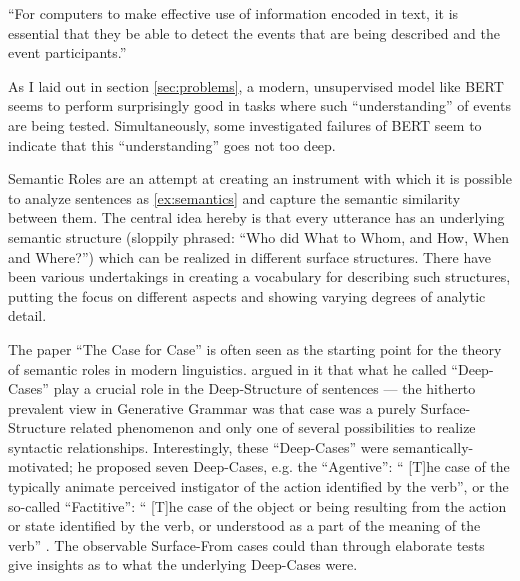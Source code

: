 ``For computers to make effective use of information encoded in text, it is essential that
they be able to detect the events that are being described and the event participants.''
\citep{palmer2010semantic}

As I laid out in section \ref{sec:problems}, a modern, unsupervised model
like BERT seems to perform surprisingly good in tasks where such ``understanding'' of
events are being tested.
Simultaneously, some investigated failures of BERT seem to indicate that this ``understanding''
goes not too deep.

Semantic Roles are an attempt at creating an instrument with which it is possible to analyze
sentences as \ref{ex:semantics} and capture the semantic similarity between them. The central
idea hereby is that every utterance has an underlying semantic structure (sloppily phrased: ``Who did What to Whom, and How, When and Where?'') which
can be realized in different surface structures. There have been various undertakings in
creating a vocabulary for describing such structures, putting the focus on different aspects and showing varying degrees of {\color{red} analytic detail}.

The paper ``The Case for Case'' \citep{fillmore1967case} is often seen as the starting point for
the theory of semantic roles in modern linguistics. \citeauthor{fillmore1967case} argued in it
that what he called ``Deep-Cases'' play a crucial role in the Deep-Structure of sentences ---
the hitherto prevalent view in Generative Grammar was that case was a purely Surface-Structure
related phenomenon and only one of several possibilities to realize syntactic relationships.
Interestingly, these ``Deep-Cases'' were semantically-motivated; he proposed
seven Deep-Cases, e.g. the ``Agentive'': `` [T]he case of the typically animate perceived instigator of the
action identified by the verb'', or the so-called ``Factitive'': `` [T]he case of the object or being resulting from the action or
state identified by the verb, or understood as a part of the meaning of the verb'' \citep[p.~46]{fillmore1967case}.
The observable Surface-From cases could than through elaborate tests give insights as to what the
underlying Deep-Cases were.

